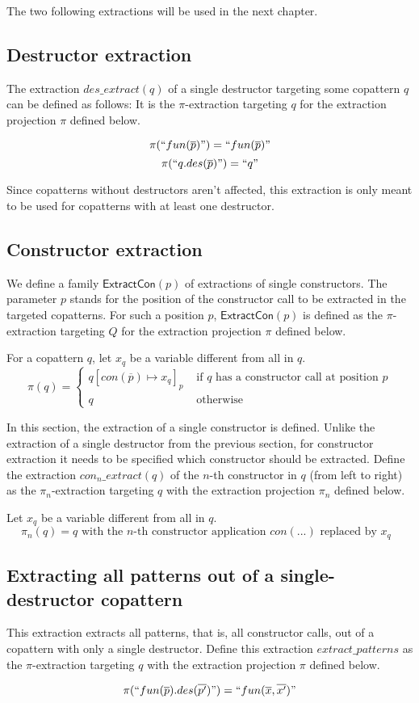 The two following extractions will be used in the next chapter.

\subsection{Destructor extraction}

The extraction $des\_extract(q)$ of a single destructor targeting some copattern $q$ can be defined as follows: It is the $\pi$-extraction targeting $q$ for the extraction projection $\pi$ defined below.

\[
\pi(`` fun(\overline{p}) ") = `` fun(\overline{p}) "
\]
\[
\pi(`` q.des(\overline{p}) ") = `` q "
\]

Since copatterns without destructors aren't affected, this extraction is only meant to be used for copatterns with at least one destructor. 

\subsection{Constructor extraction}


We define a family $\textsf{ExtractCon}(p)$ of extractions of single constructors. The parameter $p$ stands for the position of the constructor call to be extracted in the targeted copatterns. For such a position $p$, $\textsf{ExtractCon}(p)$ is defined as the $\pi$-extraction targeting $Q$ for the extraction projection $\pi$ defined below.

For a copattern $q$, let $x_q$ be a variable different from all in $q$.
\[
\pi(q) = \begin{cases}
             q[con(\overline{p}) \mapsto x_q]_p &\text{ if } q \text{ has a constructor call at position } p \\
             q &\text{ otherwise}
             \end{cases}
\]


In this section, the extraction of a single constructor is defined. Unlike the extraction of a single destructor from the previous section, for constructor extraction it needs to be specified which constructor should be extracted. Define the extraction $con_n\_extract(q)$ of the $n$-th constructor in $q$ (from left to right) as the $\pi_n$-extraction targeting $q$ with the extraction projection $\pi_n$ defined below.

Let $x_q$ be a variable different from all in $q$.
\[
\pi_n(q) = q \text{ with the $n$-th constructor application } con(...) \text{ replaced by $x_q$ }
\]

\subsection{Extracting all patterns out of a single-destructor copattern}

This extraction extracts all patterns, that is, all constructor calls, out of a copattern with only a single destructor. Define this extraction $extract\_patterns$ as the $\pi$-extraction targeting $q$ with the extraction projection $\pi$ defined below.

\[
\pi(`` fun(\overline{p}).des(\overline{p'}) ") = `` fun(\overline{x}, \overline{x'}) "
\]